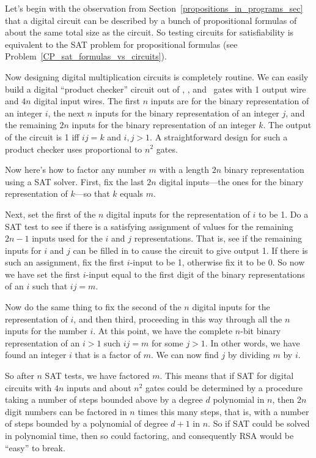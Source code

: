 Let's begin with the observation from
Section~\ref{propositions_in_programs_sec} that a digital circuit can
be described by a bunch of propositional formulas of about the same
total size as the circuit.  So testing circuits for satisfiability is
equivalent to the SAT problem for propositional formulas (see
Problem~\ref{CP_sat_formulas_vs_circuits}).

Now designing digital multiplication circuits is completely routine.
We can easily build a digital ``product checker'' circuit out of
\QAND, \QOR, and \QNOT\ gates with 1 output wire and $4n$ digital
input wires.  The first $n$ inputs are for the binary representation
of an integer $i$, the next $n$ inputs for the binary representation
of an integer $j$, and the remaining $2n$ inputs for the binary
representation of an integer $k$.  The output of the circuit is 1 iff
$ij=k$ and $i,j>1$.  A straightforward design for such a product
checker uses proportional to $n^2$ gates.

Now here's how to factor any number $m$ with a length $2n$ binary
representation using a SAT solver.  First, fix the last $2n$ digital
inputs---the ones for the binary representation of $k$---so that $k$
equals $m$.

Next, set the first of the $n$ digital inputs for the representation
of $i$ to be 1.  Do a SAT test to see if there is a satisfying
assignment of values for the remaining $2n-1$ inputs used for the $i$
and $j$ representations.  That is, see if the remaining inputs for $i$
and $j$ can be filled in to cause the circuit to give output 1.  If
there is such an assignment, fix the first $i$-input to be 1,
otherwise fix it to be 0.  So now we have set the first $i$-input
equal to the first digit of the binary representations of an $i$ such
that $ij=m$.

Now do the same thing to fix the second of the $n$ digital inputs for
the representation of $i$, and then third, proceeding in this way
through all the $n$ inputs for the number $i$.  At this point, we have
the complete $n$-bit binary representation of an $i>1$ such $ij=m$ for
some $j>1$.  In other words, we have found an integer $i$ that is a
factor of $m$.  We can now find $j$ by dividing $m$ by $i$.

So after $n$ SAT tests, we have factored $m$.  This means that if SAT
for digital circuits with $4n$ inputs and about $n^2$ gates could be
determined by a procedure taking a number of steps bounded above by a
degree $d$ polynomial in $n$, then $2n$ digit numbers can be factored
in $n$ times this many steps, that is, with a number of steps bounded
by a polynomial of degree $d+1$ in $n$.  So if SAT could be solved
in polynomial time, then so could factoring, and consequently RSA
would be ``easy'' to break.

